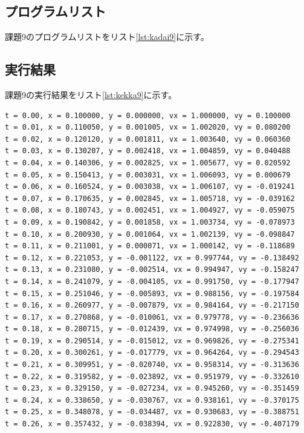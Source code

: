 \documentclass[a4j,titlepage]{jsarticle}
\begin{document}
\subsection{プログラムリスト}
課題9のプログラムリストをリスト\ref{lst:kadai9}に示す。



\subsection{実行結果}
課題9の実行結果をリスト\ref{lst:kekka9}に示す。

\begin{lstlisting}[style=text,caption=課題9の実行結果,label=lst:kekka9]
t = 0.00, x = 0.100000, y = 0.000000, vx = 1.000000, vy = 0.100000
t = 0.01, x = 0.110050, y = 0.001005, vx = 1.002020, vy = 0.080200
t = 0.02, x = 0.120120, y = 0.001811, vx = 1.003640, vy = 0.060360
t = 0.03, x = 0.130207, y = 0.002418, vx = 1.004859, vy = 0.040488
t = 0.04, x = 0.140306, y = 0.002825, vx = 1.005677, vy = 0.020592
t = 0.05, x = 0.150413, y = 0.003031, vx = 1.006093, vy = 0.000679
t = 0.06, x = 0.160524, y = 0.003038, vx = 1.006107, vy = -0.019241
t = 0.07, x = 0.170635, y = 0.002845, vx = 1.005718, vy = -0.039162
t = 0.08, x = 0.180743, y = 0.002451, vx = 1.004927, vy = -0.059075
t = 0.09, x = 0.190842, y = 0.001858, vx = 1.003734, vy = -0.078973
t = 0.10, x = 0.200930, y = 0.001064, vx = 1.002139, vy = -0.098847
t = 0.11, x = 0.211001, y = 0.000071, vx = 1.000142, vy = -0.118689
t = 0.12, x = 0.221053, y = -0.001122, vx = 0.997744, vy = -0.138492
t = 0.13, x = 0.231080, y = -0.002514, vx = 0.994947, vy = -0.158247
t = 0.14, x = 0.241079, y = -0.004105, vx = 0.991750, vy = -0.177947
t = 0.15, x = 0.251046, y = -0.005893, vx = 0.988156, vy = -0.197584
t = 0.16, x = 0.260977, y = -0.007879, vx = 0.984164, vy = -0.217150
t = 0.17, x = 0.270868, y = -0.010061, vx = 0.979778, vy = -0.236636
t = 0.18, x = 0.280715, y = -0.012439, vx = 0.974998, vy = -0.256036
t = 0.19, x = 0.290514, y = -0.015012, vx = 0.969826, vy = -0.275341
t = 0.20, x = 0.300261, y = -0.017779, vx = 0.964264, vy = -0.294543
t = 0.21, x = 0.309951, y = -0.020740, vx = 0.958314, vy = -0.313636
t = 0.22, x = 0.319582, y = -0.023892, vx = 0.951979, vy = -0.332610
t = 0.23, x = 0.329150, y = -0.027234, vx = 0.945260, vy = -0.351459
t = 0.24, x = 0.338650, y = -0.030767, vx = 0.938161, vy = -0.370175
t = 0.25, x = 0.348078, y = -0.034487, vx = 0.930683, vy = -0.388751
t = 0.26, x = 0.357432, y = -0.038394, vx = 0.922830, vy = -0.407179

\end{lstlisting}
\end{document}

